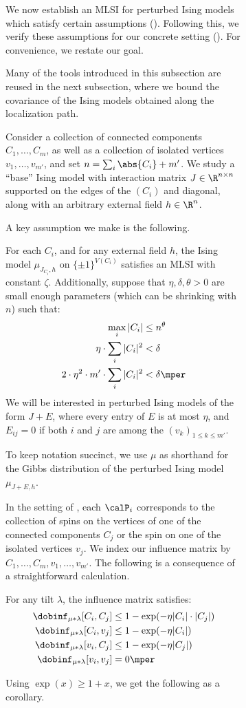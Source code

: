 \documentclass[11pt,letterpaper]{article}
\begin{document}
\begin{figure}
\begin{figure}
We now establish an MLSI for perturbed Ising models which satisfy certain assumptions (). Following this, we verify these assumptions for our concrete setting (). For convenience, we restate our goal.

\nearforestjunk*

Many of the tools introduced in this subsection are reused in the next subsection, where we bound the covariance of the Ising models obtained along the localization path.

 Consider a collection of connected components $C_1,\dots,C_m$, as well as a collection of isolated vertices $v_1,\dots,v_{m'}$, and set $n = \sum_{i} \abs{C_i} + m'$. We study a ``base'' Ising model with interaction matrix $J \in \R^{n \times n}$ supported on the edges of the $(C_i)$ and diagonal, along with an arbitrary external field $h \in \R^n$. 

A key assumption we make is the following.
\begin{assumption}  \label{ass:parameters}
    For each $C_i$, and for any external field $h$, the Ising model $\mu_{J_{C_i},h}$ on $\{\pm1\}^{V(C_i)}$ satisfies an MLSI with constant $\zeta$.
    Additionally, suppose that $\eta, \delta, \theta > 0$ are small enough parameters (which can be shrinking with $n$) such that:
    \begin{align*}
        \max_i |C_i| &\le n^{\theta} \\
        \eta \cdot \sum_i |C_i|^2 &< \delta \\
        2\cdot \eta^2\cdot m' \cdot \sum_i |C_i|^2 &< \delta\mper
    \end{align*}
    We will be interested in perturbed Ising models of the form $J+E$, where every entry of $E$ is at most $\eta$, and $E_{ij} = 0$ if both $i$ and $j$ are among the $(v_k)_{1 \le k \le m'}$.
\end{assumption}
To keep notation succinct, we use $\mu$ as shorthand for the Gibbs distribution of the perturbed Ising model $\mu_{J+E, h}$.

In the setting of , each $\calP_i$ corresponds to the collection of spins on the vertices of one of the connected components $C_j$ or the spin on one of the isolated vertices $v_j$.
We index our influence matrix by $C_1,\dots,C_m,v_1,\dots,v_{m'}$.
The following is a consequence of a straightforward calculation.

\begin{observation}
    For any tilt $\lambda$, the influence matrix satisfies:
    \begin{align*}
        \dobinf_{\mu\ast\lambda}[C_i, C_j] &\le 1 - \exp(-\eta |C_i|\cdot|C_j|) \\
        \dobinf_{\mu\ast\lambda}[C_i, v_j] &\le 1 - \exp(-\eta |C_i|) \\
        \dobinf_{\mu\ast\lambda}[v_i, C_j] &\le 1 - \exp(-\eta |C_j|) \\
        \dobinf_{\mu\ast\lambda}[v_i, v_j] &= 0\mper
    \end{align*}
\end{observation}
Using $\exp(x)\ge 1+x$, we get the following as a corollary.


\end{figure}
\end{figure}
\end{document}
